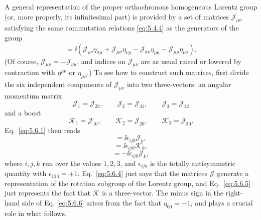 A general representation of the proper orthochronous homogeneous Lorentz group
(or, more properly, its infinitesimal part) is provided by a set of matrices
$\mathcal{J}_{\mu\nu}$ satisfying the same commutation relations \eqref{eq:5.4.4} as the
generators of the group
\begin{equation}
[\mathcal{J}_{\mu\nu},\mathcal{J}_{\rho\sigma}]
=\ii(\mathcal{J}_{\rho\nu}\eta_{\sigma\mu}
+\mathcal{J}_{\mu\sigma}\eta_{\nu\rho}
-\mathcal{J}_{\sigma\nu}\eta_{\rho\mu}
-\mathcal{J}_{\mu\rho}\eta_{\nu\sigma}).
\tag{5.6.1}\label{eq:5.6.1}
\end{equation}
(Of course, $\mathcal{J}_{\mu\nu}=-\mathcal{J}_{\nu\mu}$, and indices on
$\mathcal{J}_{\mu\nu}$ are as usual raised or lowered by contraction with
$\eta^{\mu\nu}$ or $\eta_{\mu\nu}$.) To see how to construct such matrices,
first divide the six independent components of $\mathcal{J}_{\mu\nu}$ into two
three-vectors: an angular momentum matrix
\begin{equation}
\mathcal{J}_1=\mathcal{J}_{23},\qquad
\mathcal{J}_2=\mathcal{J}_{31},\qquad
\mathcal{J}_3=\mathcal{J}_{12}
\tag{5.6.2}\label{eq:5.6.2}
\end{equation}
and a boost
\begin{equation}
\mathcal{K}_1=\mathcal{J}_{10},\qquad
\mathcal{K}_2=\mathcal{J}_{20},\qquad
\mathcal{K}_3=\mathcal{J}_{30}.
\tag{5.6.3}\label{eq:5.6.3}
\end{equation}
Eq.~\eqref{eq:5.6.1} then reads
\begin{equation}
[\mathcal{J}_i,\mathcal{J}_j]=\ii\epsilon_{ijk}\mathcal{J}_k,
\tag{5.6.4}\label{eq:5.6.4}
\end{equation}
\begin{equation}
[\mathcal{J}_i,\mathcal{K}_j]=\ii\epsilon_{ijk}\mathcal{K}_k,
\tag{5.6.5}\label{eq:5.6.5}
\end{equation}
\begin{equation}
[\mathcal{K}_i,\mathcal{K}_j]=-\ii\epsilon_{ijk}\mathcal{J}_k,
\tag{5.6.6}\label{eq:5.6.6}
\end{equation}
where $i,j,k$ run over the values $1,2,3$, and $\epsilon_{ijk}$ is the totally
antisymmetric quantity with $\epsilon_{123}=+1$. Eq.~\eqref{eq:5.6.4} just says that
the matrices $\mathcal{J}$ generate a representation of the rotation subgroup
of the Lorentz group, and Eq.~\eqref{eq:5.6.5} just represents the fact that
$\mathcal{K}$ is a three-vector. The minus sign in the right-hand side of Eq.
\eqref{eq:5.6.6} arises from the fact that $\eta_{00}=-1$, and plays a crucial role in
what follows.

